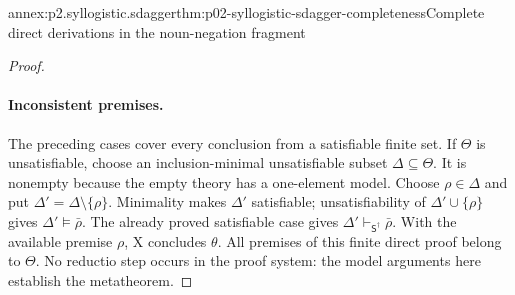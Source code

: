 \begin{annexitem}{annex:p2.syllogistic.sdagger}{thm:p02-syllogistic-sdagger-completeness}{Complete direct derivations in the noun-negation fragment}
\begin{proof}
\paragraph{Inconsistent premises.}
The preceding cases cover every conclusion from a satisfiable finite set.
If \(\Theta\) is unsatisfiable, choose an inclusion-minimal unsatisfiable
subset \(\Delta\subseteq\Theta\). It is nonempty because the empty
theory has a one-element model. Choose \(\rho\in\Delta\) and put
\(\Delta'=\Delta\setminus\{\rho\}\). Minimality makes \(\Delta'\)
satisfiable; unsatisfiability of \(\Delta'\cup\{\rho\}\) gives
\(\Delta'\models\bar\rho\). The already proved satisfiable case gives
\(\Delta'\vdash_{\mathsf S^\dagger}\bar\rho\). With the available
premise \(\rho\), X concludes \(\theta\). All premises of this finite
direct proof belong to \(\Theta\). No reductio step occurs in the proof
system: the model arguments here establish the metatheorem.
\end{proof}
\end{annexitem}

